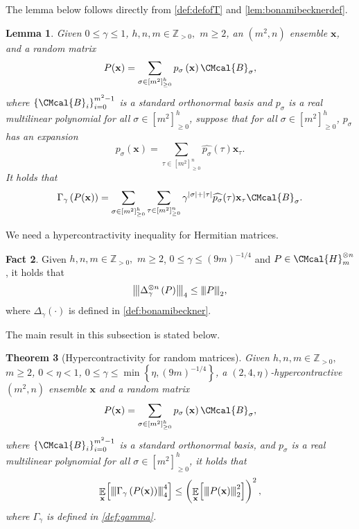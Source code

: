 \documentclass[11pt]{article}
\def\B{\CMcal{B}}
\def\H{\CMcal{H}}
\theoremstyle{plain}
\newtheorem{theorem}{Theorem}[section]
\newtheorem{lemma}[theorem]{Lemma}
\theoremstyle{definition}
\newtheorem{fact}[theorem]{Fact}
\newcommand {\minusspace} {\: \! \!}
\newcommand {\Fn} [2] {\ensuremath{ #1 \minusspace \Br{ #2 } }}
\newcommand {\set} [1] {\ensuremath{ \left\lbrace #1 \right\rbrace }}
\newcommand {\br} [1] {\ensuremath{ \left( #1 \right) }}
\newcommand {\Br} [1] {\ensuremath{ \left[ #1 \right] }}
\newcommand {\ab} [1] {\ensuremath{ \left| #1 \right| }}
\DeclareMathOperator*{\bigE}{\mathbb{E}}
\newcommand {\expec} [2] {\Fn{\bigE_{\substack{#1}}}{#2}}
\newcommand{\nnorm}[1]{{\left\vert\kern-0.25ex\left\vert\kern-0.25ex\left\vert #1
		\right\vert\kern-0.25ex\right\vert\kern-0.25ex\right\vert}}
\newcommand{\posint}{{\mathbb Z}_{>0}}
\newcommand{\randx}{\ensuremath{\mathbf{x}}}
\newcommand{\1}{\mathbb{1}} %
\begin{document}
The lemma below follows directly from \cref{def:defofT} and \cref{lem:bonamibecknerdef}.

\begin{lemma}\label{lem:gammaoperator}
	Given $0\leq\gamma\leq 1$, $h,n,m\in\posint,$ $m\geq 2$, an $(m^2,n)$ ensemble $\randx$, and a random matrix
 \begin{equation*}
P(\randx)=\sum_{\sigma\in\Br{m^2}_{\geq0}^h}p_\sigma\br{\randx}\B_\sigma,
	\end{equation*}
	where $\set{\B_i}_{i=0}^{m^2-1}$ is a standard orthonormal basis and $p_\sigma$ is a real multilinear polynomial for all $\sigma\in\Br{m^2}_{\geq0}^h$, suppose that for all $\sigma\in\Br{m^2}_{\geq0}^h$, $p_\sigma$ has an expansion
	\[p_\sigma(\randx)=\sum_{\tau\in\Br{m^2}_{\geq0}^n}\widehat{p_\sigma}(\tau)\randx_\tau.\]
	 It holds that
	\begin{equation}\label{eqn:gamma}
	\Gamma_{\gamma}\br{P(\randx)}=\sum_{\sigma\in\Br{m^2}_{\geq0}^h}\sum_{\tau\in\Br{m^2}_{\geq0}^n}\gamma^{\ab{\sigma}+\ab{\tau}}\widehat{p_\sigma}(\tau)\randx_\tau\B_{\sigma}.
	\end{equation}
\end{lemma}

We need a hypercontractivity inequality for Hermitian matrices.
	\begin{fact}\label{lem:multihypercontractivity}\cite[Lemma 8.3]{qin2021nonlocal}
		Given $h,n,m\in\posint,$ $m\geq 2$, $0\leq\gamma\leq\br{9m}^{-1/4}$ and $P\in\H_m^{\otimes n}$, it holds that$$\nnorm{\Delta_\gamma^{\otimes n}\br{P}}_{4}\leq\nnorm{P}_2,$$
  where $\Delta_{\gamma}\br{\cdot}$ is defined in \cref{def:bonamibeckner}.
	\end{fact}
	
	The main result in this subsection is stated below.

	\begin{theorem}[Hypercontractivity for random matrices]\label{lem:hypercontractivity}
		Given $h,n,m\in\posint,$ $m\geq 2$, $0<\eta<1$, $0\leq\gamma\leq\min\set{\eta,\br{9m}^{-1/4}}$, a $(2,4,\eta)$-hypercontractive $(m^2,n)$ ensemble $\randx$ and a random matrix
 \begin{equation*}
P(\randx)=\sum_{\sigma\in[m^2]_{\geq0}^h}p_\sigma\br{\randx}\B_\sigma,
	\end{equation*}
	where $\set{\B_i}_{i=0}^{m^2-1}$ is a standard orthonormal basis, and $p_\sigma$ is a real multilinear polynomial for all $\sigma\in[m^2]_{\geq0}^h$, it holds that
		\[\expec{\randx}{\nnorm{\Gamma_{\gamma}\br{P(\randx)}}_4^4}\leq \br{\expec{\randx}{\nnorm{P(\randx)}_2^2}}^{2},\]
		where $\Gamma_\gamma$ is defined in \cref{def:gamma}.
	\end{theorem}	
	
\end{document}
